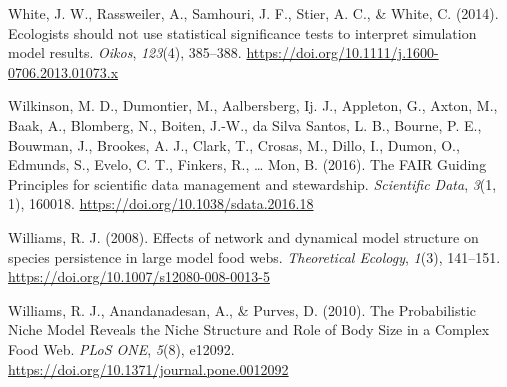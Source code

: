 \documentclass{article}
\newlength{\cslhangindent}
\newlength{\cslentryspacingunit} %
\newenvironment{CSLReferences}[2] %
 {%
  \setlength{\parindent}{0pt}
  \ifodd #1
  \let\oldpar\par
  \def\par{\hangindent=\cslhangindent\oldpar}
  \fi
  \setlength{\parskip}{#2\cslentryspacingunit}
 }%
 {}
\begin{document}
\begin{CSLReferences}{1}{0}
\leavevmode{}%
White, J. W., Rassweiler, A., Samhouri, J. F., Stier, A. C., \& White,
C. (2014). Ecologists should not use statistical significance tests to
interpret simulation model results. \emph{Oikos}, \emph{123}(4),
385--388. \url{https://doi.org/10.1111/j.1600-0706.2013.01073.x}

\leavevmode{}%
Wilkinson, M. D., Dumontier, M., Aalbersberg, Ij. J., Appleton, G.,
Axton, M., Baak, A., Blomberg, N., Boiten, J.-W., da Silva Santos, L.
B., Bourne, P. E., Bouwman, J., Brookes, A. J., Clark, T., Crosas, M.,
Dillo, I., Dumon, O., Edmunds, S., Evelo, C. T., Finkers, R., \ldots{}
Mon, B. (2016). The {FAIR Guiding Principles} for scientific data
management and stewardship. \emph{Scientific Data}, \emph{3}(1, 1),
160018. \url{https://doi.org/10.1038/sdata.2016.18}

\leavevmode{}%
Williams, R. J. (2008). Effects of network and dynamical model structure
on species persistence in large model food webs. \emph{Theoretical
Ecology}, \emph{1}(3), 141--151.
\url{https://doi.org/10.1007/s12080-008-0013-5}

\leavevmode{}%
Williams, R. J., Anandanadesan, A., \& Purves, D. (2010). The
{Probabilistic Niche Model Reveals} the {Niche Structure} and {Role} of
{Body Size} in a {Complex Food Web}. \emph{PLoS ONE}, \emph{5}(8),
e12092. \url{https://doi.org/10.1371/journal.pone.0012092}

\end{CSLReferences}



\end{document}
